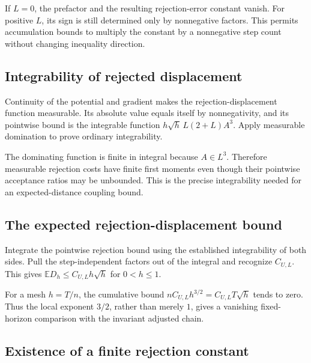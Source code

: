 \documentclass[11pt,a4paper]{report}
\begin{document}
If \(L=0\), the prefactor and the resulting rejection-error constant vanish. For positive \(L\), its sign is still determined only by nonnegative factors. This permits accumulation bounds to multiply the constant by a nonnegative step count without changing inequality direction.

\subsection{\texorpdfstring{Integrability of rejected displacement}{Integrability of rejected displacement}}
\label{report-step-UnadjustedLangevin-MALAError-lean-24}


Continuity of the potential and gradient makes the rejection-displacement function measurable. Its absolute value equals itself by nonnegativity, and its pointwise bound is the integrable function \(h\sqrt h\,L(2+L)A^3\). Apply measurable domination to prove ordinary integrability.



The dominating function is finite in integral because \(A\in L^3\). Therefore measurable rejection costs have finite first moments even though their pointwise acceptance ratios may be unbounded. This is the precise integrability needed for an expected-distance coupling bound.

\subsection{\texorpdfstring{The expected rejection-displacement bound}{The expected rejection-displacement bound}}
\label{report-step-UnadjustedLangevin-MALAError-lean-25}


Integrate the pointwise rejection bound using the established integrability of both sides. Pull the step-independent factors out of the integral and recognize \(C_{U,L}\). This gives \(\mathbb ED_h\le C_{U,L}h\sqrt h\) for \(0<h\le1\).



For a mesh \(h=T/n\), the cumulative bound \(n C_{U,L}h^{3/2}=C_{U,L}T\sqrt h\) tends to zero. Thus the local exponent \(3/2\), rather than merely \(1\), gives a vanishing fixed-horizon comparison with the invariant adjusted chain.

\subsection{\texorpdfstring{Existence of a finite rejection constant}{Existence of a finite rejection constant}}
\label{report-step-UnadjustedLangevin-MALAError-lean-26}
\end{document}
